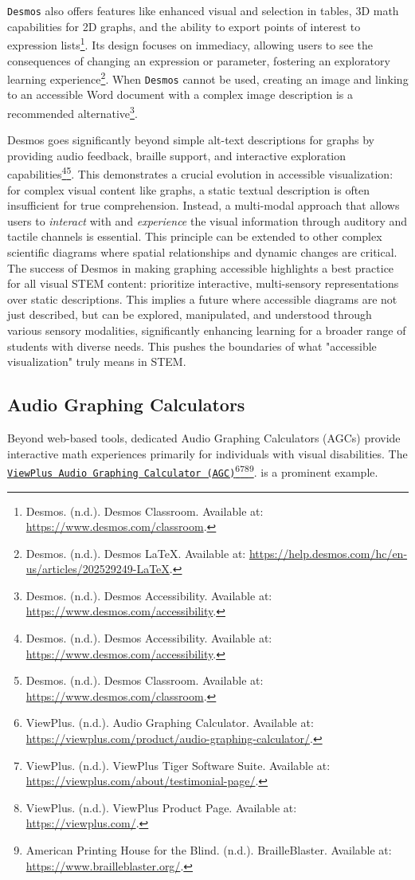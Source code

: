 \texttt{Desmos} also offers features like enhanced visual and selection in tables, 3D math capabilities for 2D graphs, and the ability to export points of interest to expression lists\footnote{Desmos. (n.d.). Desmos Classroom. Available at: \url{https://www.desmos.com/classroom}.}. Its design focuses on immediacy, allowing users to see the consequences of changing an expression or parameter, fostering an exploratory learning experience\footnote{Desmos. (n.d.). Desmos LaTeX. Available at: \url{https://help.desmos.com/hc/en-us/articles/202529249-LaTeX}.}. When \texttt{Desmos} cannot be used, creating an image and linking to an accessible Word document with a complex image description is a recommended alternative\footnote{Desmos. (n.d.). Desmos Accessibility. Available at: \url{https://www.desmos.com/accessibility}.}.

Desmos goes significantly beyond simple alt-text descriptions for graphs by providing audio feedback, braille support, and interactive exploration capabilities\footnote{Desmos. (n.d.). Desmos Accessibility. Available at: \url{https://www.desmos.com/accessibility}.}\footnote{Desmos. (n.d.). Desmos Classroom. Available at: \url{https://www.desmos.com/classroom}.}. This demonstrates a crucial evolution in accessible visualization: for complex visual content like graphs, a static textual description is often insufficient for true comprehension. Instead, a multi-modal approach that allows users to \textit{interact} with and \textit{experience} the visual information through auditory and tactile channels is essential. This principle can be extended to other complex scientific diagrams where spatial relationships and dynamic changes are critical. The success of Desmos in making graphing accessible highlights a best practice for all visual STEM content: prioritize interactive, multi-sensory representations over static descriptions. This implies a future where accessible diagrams are not just described, but can be explored, manipulated, and understood through various sensory modalities, significantly enhancing learning for a broader range of students with diverse needs. This pushes the boundaries of what "accessible visualization" truly means in STEM.

\subsection{Audio Graphing Calculators}
Beyond web-based tools, dedicated Audio Graphing Calculators (AGCs) provide interactive math experiences primarily for individuals with visual disabilities. The \href{https://viewplus.com/product/audio-graphing-calculator/}{\texttt{ViewPlus Audio Graphing Calculator (AGC)}}\footnote{ViewPlus. (n.d.). Audio Graphing Calculator. Available at: \url{https://viewplus.com/product/audio-graphing-calculator/}.}\footnote{ViewPlus. (n.d.). ViewPlus Tiger Software Suite. Available at: \url{https://viewplus.com/about/testimonial-page/}.}\footnote{ViewPlus. (n.d.). ViewPlus Product Page. Available at: \url{https://viewplus.com/}.}\footnote{American Printing House for the Blind. (n.d.). BrailleBlaster. Available at: \url{https://www.brailleblaster.org/}.}. is a prominent example.

